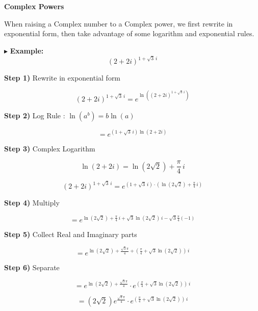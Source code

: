 \documentclass{ximera}
\begin{document}
\begin{procedure} \textbf{\textcolor{purple!85!blue}{Complex Powers}}  


When raising a Complex number to a Complex power, we first rewrite in exponential form, then take advantage of some logarithm and exponential rules.


$\blacktriangleright$ \textbf{Example:}  
\[  (2+2i)^{1+\sqrt{3} \, i}    \]


\textbf{\textcolor{blue!75!black}{Step 1)}}  Rewrite in exponential form 




\[  (2+2i)^{1+\sqrt{3} \, i}   =        e^{\ln\left( (2+2i)^{1+\sqrt{3} \, i} \right)} \]




\textbf{\textcolor{blue!75!black}{Step 2)}}  Log Rule : $\ln(a^b) = b \ln(a)$ 


\[   =        e^{(1+\sqrt{3} \, i) \ln(2+2i)} \]




\textbf{\textcolor{blue!75!black}{Step 3)}}  Complex Logarithm 


\[   \ln(2+2i) = \ln(2\sqrt{2}) + \frac{\pi}{4} \, i \]



\[   (2+2i)^{1+\sqrt{3} \, i}   =       e^{(1+\sqrt{3} \, i) \cdot (\ln(2\sqrt{2}) + \frac{\pi}{4} \, i)} \]






\textbf{\textcolor{blue!75!black}{Step 4)}}  Multiply 



\[
=    e^{   \ln(2\sqrt{2}) +   \frac{\pi}{4} \, i     +  \sqrt{3} \ln(2\sqrt{2}) \, i - \sqrt{3}  \frac{\pi}{4} (-1) }
\]



\textbf{\textcolor{blue!75!black}{Step 5)}}  Collect Real and Imaginary parts 



\[
=   e^{   \ln(2\sqrt{2}) + \frac{\sqrt{3}\pi}{4} +  (\frac{\pi}{4} + \sqrt{3} \ln(2\sqrt{2}) )  \, i   }
\]




\textbf{\textcolor{blue!75!black}{Step 6)}}  Separate 


\[
=   e^{   \ln(2\sqrt{2}) + \frac{\sqrt{3}\pi}{4}} \cdot  e^{(\frac{\pi}{4} + \sqrt{3} \ln(2\sqrt{2}) )  \, i}
\]





\[
=   (2\sqrt{2})  e^{\frac{\sqrt{3}\pi}{4}} \cdot  e^{(\frac{\pi}{4} + \sqrt{3} \ln(2\sqrt{2}) )  \, i}
\]





\end{procedure}
\end{document}
